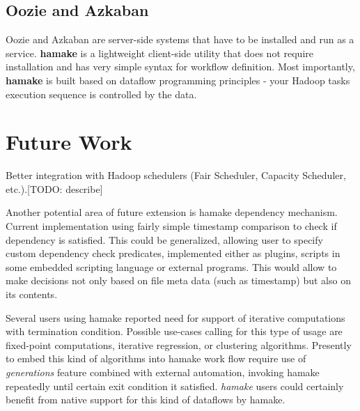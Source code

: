 \documentclass[11pt,twocolumn]{article}
\begin{document}
\subsection*{Oozie and Azkaban}

Oozie and Azkaban are server-side systems that have to be installed
and run as a service. \textbf{hamake} is a lightweight client-side
utility that does not require installation and has very simple syntax
for workflow definition.  Most importantly, \textbf{hamake} is built
based on dataflow programming principles - your Hadoop tasks execution
sequence is controlled by the data.
 

\section{Future Work}

Better integration with Hadoop schedulers (Fair Scheduler, Capacity
Scheduler, etc.).[TODO: describe]

Another potential area of future extension is hamake dependency
mechanism. Current implementation using fairly simple timestamp
comparison to check if dependency is satisfied. This could be
generalized, allowing user to specify custom dependency check
predicates, implemented either as plugins, scripts in some embedded
scripting language or external programs. This would allow to make
decisions not only based on file meta data (such as timestamp) but
also on its contents.

Several users using hamake reported need for support of iterative
computations with termination condition. Possible use-cases calling
for this type of usage are fixed-point computations, iterative
regression, or clustering algorithms. Presently to embed this kind of
algorithms into hamake work flow require use of \textit{generations}
feature combined with external automation, invoking hamake repeatedly
until certain exit condition it satisfied. \textit{hamake} users could
certainly benefit from native support for this kind of dataflows by
hamake.

\nocite{*}


\end{document}

